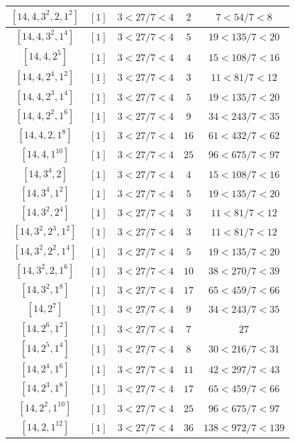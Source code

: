 \documentclass{article}%
\begin{document}
\begin{center}
\begin{longtable}{||c|c|c|c|c||}
$[14, 4, 3^{2}, 2, 1^{2}]$ & $[1]$ & $3 < 27/7 < 4$ & $2$ & $7 < 54/7 < 8$ \\ \hline 
$[14, 4, 3^{2}, 1^{4}]$ & $[1]$ & $3 < 27/7 < 4$ & $5$ & $19 < 135/7 < 20$ \\ \hline 
$[14, 4, 2^{5}]$ & $[1]$ & $3 < 27/7 < 4$ & $4$ & $15 < 108/7 < 16$ \\ \hline 
$[14, 4, 2^{4}, 1^{2}]$ & $[1]$ & $3 < 27/7 < 4$ & $3$ & $11 < 81/7 < 12$ \\ \hline 
$[14, 4, 2^{3}, 1^{4}]$ & $[1]$ & $3 < 27/7 < 4$ & $5$ & $19 < 135/7 < 20$ \\ \hline 
$[14, 4, 2^{2}, 1^{6}]$ & $[1]$ & $3 < 27/7 < 4$ & $9$ & $34 < 243/7 < 35$ \\ \hline 
$[14, 4, 2, 1^{8}]$ & $[1]$ & $3 < 27/7 < 4$ & $16$ & $61 < 432/7 < 62$ \\ \hline 
$[14, 4, 1^{10}]$ & $[1]$ & $3 < 27/7 < 4$ & $25$ & $96 < 675/7 < 97$ \\ \hline 
$[14, 3^{4}, 2]$ & $[1]$ & $3 < 27/7 < 4$ & $4$ & $15 < 108/7 < 16$ \\ \hline 
$[14, 3^{4}, 1^{2}]$ & $[1]$ & $3 < 27/7 < 4$ & $5$ & $19 < 135/7 < 20$ \\ \hline 
$[14, 3^{2}, 2^{4}]$ & $[1]$ & $3 < 27/7 < 4$ & $3$ & $11 < 81/7 < 12$ \\ \hline 
$[14, 3^{2}, 2^{3}, 1^{2}]$ & $[1]$ & $3 < 27/7 < 4$ & $3$ & $11 < 81/7 < 12$ \\ \hline 
$[14, 3^{2}, 2^{2}, 1^{4}]$ & $[1]$ & $3 < 27/7 < 4$ & $5$ & $19 < 135/7 < 20$ \\ \hline 
$[14, 3^{2}, 2, 1^{6}]$ & $[1]$ & $3 < 27/7 < 4$ & $10$ & $38 < 270/7 < 39$ \\ \hline 
$[14, 3^{2}, 1^{8}]$ & $[1]$ & $3 < 27/7 < 4$ & $17$ & $65 < 459/7 < 66$ \\ \hline 
$[14, 2^{7}]$ & $[1]$ & $3 < 27/7 < 4$ & $9$ & $34 < 243/7 < 35$ \\ \hline 
$[14, 2^{6}, 1^{2}]$ & $[1]$ & $3 < 27/7 < 4$ & $7$ & $27$ \\ \hline 
$[14, 2^{5}, 1^{4}]$ & $[1]$ & $3 < 27/7 < 4$ & $8$ & $30 < 216/7 < 31$ \\ \hline 
$[14, 2^{4}, 1^{6}]$ & $[1]$ & $3 < 27/7 < 4$ & $11$ & $42 < 297/7 < 43$ \\ \hline 
$[14, 2^{3}, 1^{8}]$ & $[1]$ & $3 < 27/7 < 4$ & $17$ & $65 < 459/7 < 66$ \\ \hline 
$[14, 2^{2}, 1^{10}]$ & $[1]$ & $3 < 27/7 < 4$ & $25$ & $96 < 675/7 < 97$ \\ \hline 
$[14, 2, 1^{12}]$ & $[1]$ & $3 < 27/7 < 4$ & $36$ & $138 < 972/7 < 139$ \\ \hline 

\end{longtable}
\end{center}
\end{document}
